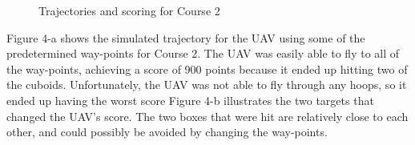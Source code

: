 \documentclass[12pt]{article}
\begin{document}
\begin{figure}[H]
	\caption{Trajectories and scoring for Course 2}
\end{figure}
Figure 4-a shows the simulated trajectory for the UAV using some of the predetermined way-points for Course 2. The UAV was easily able to fly to all of the way-points, achieving a score of 900 points because it ended up hitting two of the cuboids. Unfortunately, the UAV was not able to fly through any hoops, so it ended up having the worst score  Figure 4-b illustrates the two targets that changed the UAV's score. The two boxes that were hit are relatively close to each other, and could possibly be avoided by changing the way-points. 
\end{document}
